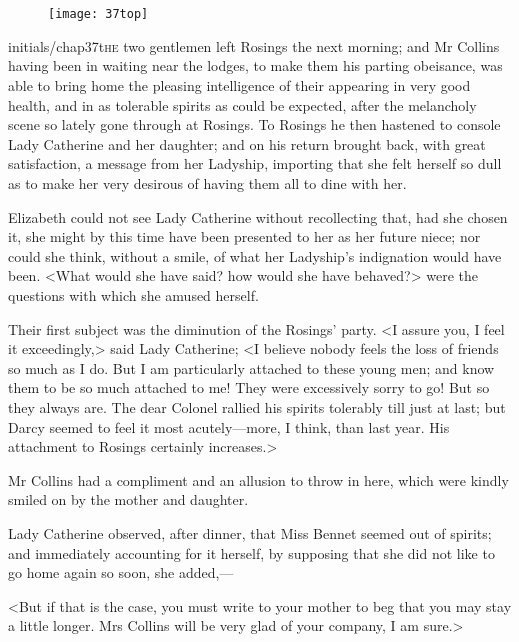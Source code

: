 \chapter[Chapter \thechapter]{}
	
\begin{figure}[t!]
\centering
\texttt{[image: 37top]}
\end{figure}


\lettrine[lines=6,image=true]{initials/chap37t}{he} two gentlemen left Rosings the next morning; and Mr Collins having been in waiting near the lodges, to make them his parting obeisance, was able to bring home the pleasing intelligence of their appearing in very good health, and in as tolerable spirits as could be expected, after the melancholy scene so lately gone through at Rosings. To Rosings he then hastened to console Lady Catherine and her daughter; and on his return brought back, with great satisfaction, a message from her Ladyship, importing that she felt herself so dull as to make her very desirous of having them all to dine with her.

Elizabeth could not see Lady Catherine without recollecting that, had she chosen it, she might by this time have been presented to her as her future niece; nor could she think, without a smile, of what her Ladyship's indignation would have been. <What would she have said? how would she have behaved?> were the questions with which she amused herself.

Their first subject was the diminution of the Rosings' party. <I assure you, I feel it exceedingly,> said Lady Catherine; <I believe nobody feels the loss of friends so much as I do. But I am particularly attached to these young men; and know them to be so much attached to me! They were excessively sorry to go! But so they always are. The dear Colonel rallied his spirits tolerably till just at last; but Darcy seemed to feel it most acutely—more, I think, than last year. His attachment to Rosings certainly increases.>

Mr Collins had a compliment and an allusion to throw in here, which were kindly smiled on by the mother and daughter.

Lady Catherine observed, after dinner, that Miss Bennet seemed out of spirits; and immediately accounting for it herself, by supposing that she did not like to go home again so soon, she added,—

<But if that is the case, you must write to your mother to beg that you may stay a little longer. Mrs Collins will be very glad of your company, I am sure.>

